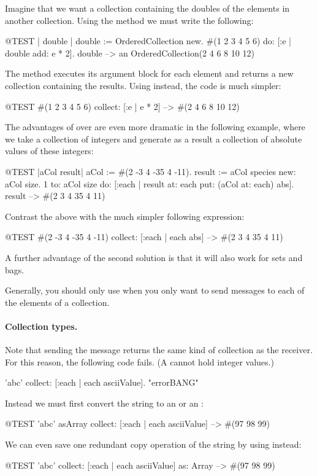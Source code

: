 \documentclass[a4paper,10pt,twoside]{book}
\begin{document}
Imagine that we want a collection containing the doubles of the elements in another collection.
Using the method  we must write the following:

\begin{code}{@TEST | double |}
double := OrderedCollection new.
#(1 2 3 4 5 6) do: [:e | double add: e * 2].
double --> an OrderedCollection(2 4 6 8 10 12)
\end{code}

\noindent
The method  executes its argument block for each element and returns a new collection containing the results.
Using  instead, the code is much simpler:
\begin{code}{@TEST}
#(1 2 3 4 5 6) collect: [:e | e * 2] --> #(2 4 6 8 10 12)
\end{code}

The advantages of  over  are even more dramatic in the following example, where we take a collection of integers and generate as a result a collection of absolute values of these integers:

\begin{code}{@TEST |aCol result|}
aCol :=  #(2 -3 4 -35 4 -11).
result := aCol species new: aCol size.
1 to: aCol size do: [:each | result at: each put: (aCol at: each) abs].
result --> #(2 3 4 35 4 11)
\end{code}
\noindent
Contrast the above with the much simpler following expression:
\begin{code}{@TEST}
#(2 -3 4 -35 4 -11) collect: [:each | each abs] --> #(2 3 4 35 4 11)
\end{code}
\noindent
A further advantage of the second solution is that it will also work for sets and bags.

Generally, you should only use  when you only want to send messages to each of the elements of a collection.

\paragraph{Collection types.}

Note that sending the message  returns the same kind of collection as the receiver.
For this reason, the following code fails.
(A  cannot hold integer values.)
\begin{code}{}
'abc' collect: [:each | each asciiValue].      "errorBANG"
\end{code}
\noindent
Instead we must first convert the string to an  or an :
\begin{code}{@TEST}
'abc' asArray collect: [:each | each asciiValue] --> #(97 98 99)
\end{code}
We can even save one redundant copy operation of the string by using  instead:
\begin{code}{@TEST}
'abc' collect: [:each | each asciiValue] as: Array --> #(97 98 99)
\end{code}
\end{document}
